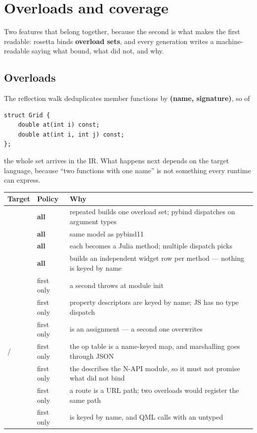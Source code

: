 \chapter{Overloads and coverage}
\label{ch:coverage}

Two features that belong together, because the second is what makes the first
readable: rosetta binds \textbf{overload sets}, and every generation writes a
machine-readable  saying what bound, what did not, and why.

\section{Overloads}

The reflection walk deduplicates member functions by \textbf{(name,
signature)}, so of

\begin{lstlisting}[style=cpp]
struct Grid {
    double at(int i) const;
    double at(int i, int j) const;
};
\end{lstlisting}

the whole set arrives in the IR. What happens next depends on the target
language, because ``two functions with one name'' is not something every runtime
can express.

\begin{center}
\small
\begin{tabular}{@{}llL{7.0cm}@{}}
\toprule
\textbf{Target} & \textbf{Policy} & \textbf{Why} \\
\midrule
{} & \textbf{all} & repeated  builds one
  overload set; pybind dispatches on argument types \\
 & \textbf{all} & same model as pybind11 \\
 & \textbf{all} & each becomes a Julia method; multiple dispatch
  picks \\
 & \textbf{all} & builds an independent widget row per method ---
  nothing is keyed by name \\
\addlinespace
{} & first only & a second  throws
   at module init \\
 & first only & property descriptors are keyed by name; JS has no
  type dispatch \\
 & first only &  is an assignment --- a second
  one overwrites \\
 /  & first only & the op table is a name-keyed map, and
  marshalling goes through JSON \\
 & first only & the  describes the N-API module, so
  it must not promise what  did not bind \\
 & first only & a route is a URL path; two overloads would register
  the same path \\
 & first only &  is keyed by name, and QML calls
  with an untyped  \\
\bottomrule
\end{tabular}
\end{center}

